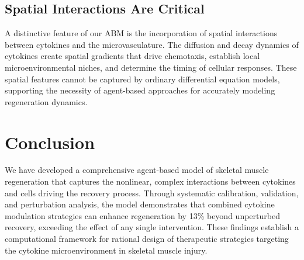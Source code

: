 \documentclass[11pt]{article}
\begin{document}
\subsection{Spatial Interactions Are Critical}

A distinctive feature of our ABM is the incorporation of spatial interactions between cytokines and the microvasculature. The diffusion and decay dynamics of cytokines create spatial gradients that drive chemotaxis, establish local microenvironmental niches, and determine the timing of cellular responses. These spatial features cannot be captured by ordinary differential equation models, supporting the necessity of agent-based approaches for accurately modeling regeneration dynamics.

\section{Conclusion}

We have developed a comprehensive agent-based model of skeletal muscle regeneration that captures the nonlinear, complex interactions between cytokines and cells driving the recovery process. Through systematic calibration, validation, and perturbation analysis, the model demonstrates that combined cytokine modulation strategies can enhance regeneration by 13\% beyond unperturbed recovery, exceeding the effect of any single intervention. These findings establish a computational framework for rational design of therapeutic strategies targeting the cytokine microenvironment in skeletal muscle injury.



\end{document}
